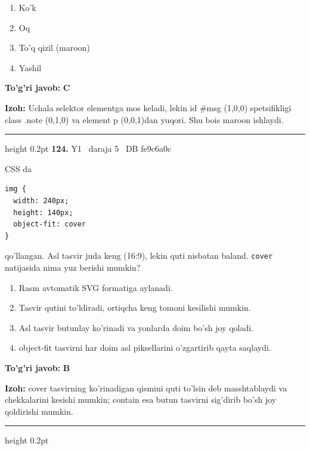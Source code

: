 \documentclass[10pt,a4paper,oneside]{article}
\begin{document}
\begin{enumerate}[label=\Alph*),leftmargin=9mm]
\item Ko'k
\item Oq
\item To'q qizil (maroon)
\item Yashil
\end{enumerate}
\begin{tcolorbox}[enhanced,breakable,colback=teal!4,colframe=teal!45!black,boxrule=0.45pt,arc=1.2mm,left=2.8mm,right=2.8mm,top=2mm,bottom=2mm,before skip=2mm,after skip=2mm]
\textbf{\color{teal}To'g'ri javob:} \textbf{C}
\par\smallskip
\textbf{Izoh:} Uchala selektor elementga mos keladi, lekin id \#msg (1,0,0) spetsifikligi class .note (0,1,0) va element p (0,0,1)dan yuqori. Shu bois maroon ishlaydi.
\end{tcolorbox}
\vspace{2mm}\hrule height 0.2pt \vspace{4mm}
\hypertarget{q124}{\textbf{\color{ink}124.}}  {\color{muted}\scriptsize Y1 \textbullet\ daraja 5 \textbullet\ DB fe9c6a0c}
\par
CSS da

\par
\begin{lstlisting}
img {
  width: 240px;
  height: 140px;
  object-fit: cover
}
\end{lstlisting}


\par
qo'llangan. Asl tasvir juda keng (16:9), lekin quti nisbatan baland. \texttt{cover} natijasida nima yuz berishi mumkin?
\begin{enumerate}[label=\Alph*),leftmargin=9mm]
\item Rasm avtomatik SVG formatiga aylanadi.
\item Tasvir qutini to'ldiradi, ortiqcha keng tomoni kesilishi mumkin.
\item Asl tasvir butunlay ko'rinadi va yonlarda doim bo'sh joy qoladi.
\item object-fit tasvirni har doim asl piksellarini o'zgartirib qayta saqlaydi.
\end{enumerate}
\begin{tcolorbox}[enhanced,breakable,colback=teal!4,colframe=teal!45!black,boxrule=0.45pt,arc=1.2mm,left=2.8mm,right=2.8mm,top=2mm,bottom=2mm,before skip=2mm,after skip=2mm]
\textbf{\color{teal}To'g'ri javob:} \textbf{B}
\par\smallskip
\textbf{Izoh:} cover tasvirning ko'rinadigan qismini quti to'lsin deb masshtablaydi va chekkalarini kesishi mumkin; contain esa butun tasvirni sig'dirib bo'sh joy qoldirishi mumkin.
\end{tcolorbox}
\vspace{2mm}\hrule height 0.2pt \vspace{4mm}
\end{document}
